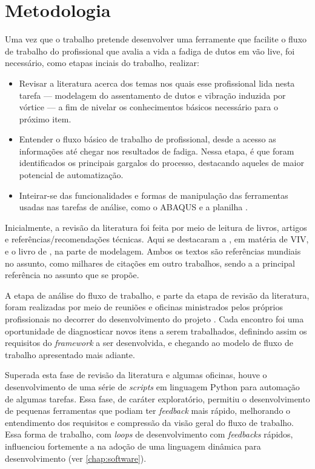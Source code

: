 \chapter{Metodologia}\label{chap:metodologia}


Uma vez que o trabalho pretende desenvolver uma ferramente que facilite o fluxo de trabalho do profissional que avalia a vida a fadiga de dutos em vão live, foi necessário, como etapas inciais do trabalho, realizar:

\begin{itemize}
    \item Revisar a literatura acerca dos temas nos quais esse profissional lida nesta tarefa --- modelagem do assentamento de dutos e vibração induzida por vórtice --- a fim de nivelar os conhecimentos básicos necessário para o próximo item.
    \item Entender o fluxo básico de trabalho de profissional, desde a acesso as informações até chegar nos resultados de fadiga. Nessa etapa, é que foram identificados os principais gargalos do processo, destacando aqueles de maior potencial de automatização.
    \item Inteirar-se das funcionalidades e formas de manipulação das ferramentas usadas nas tarefas de análise, como o ABAQUS e a planilha \fatfree.
\end{itemize}

Inicialmente, a revisão da literatura foi feita por meio de leitura de livros, artigos e referências/recomendações técnicas.
Aqui se destacaram a , em matéria de VIV, e o livro de , na parte de modelagem.
Ambos os textos são referências mundiais no assunto, como milhares de citações em outro trabalhos, sendo a  a principal referência no assunto que se propõe.

A etapa de análise do fluxo de trabalho, e parte da etapa de revisão da literatura, foram realizadas por meio de reuniões e oficinas ministrados pelos próprios profissionais no decorrer do desenvolvimento do projeto \integrispan.
Cada encontro foi uma oportunidade de diagnosticar novos itens a serem trabalhados, definindo assim os requisitos do \textit{framework}  a ser desenvolvida, e chegando ao modelo de fluxo de trabalho apresentado mais adiante.

Superada esta fase de revisão da literatura e algumas oficinas, houve o desenvolvimento de uma série de \textit{scripts} em linguagem Python para automação de algumas tarefas.
Essa fase, de caráter exploratório, permitiu o desenvolvimento de pequenas ferramentas que podiam ter \textit{feedback} mais rápido, melhorando o entendimento dos requisitos e compressão da visão geral do fluxo de trabalho.
Essa forma de trabalho, com \textit{loops} de desenvolvimento com \textit{feedbacks} rápidos, influenciou fortemente a na adoção de uma linguagem dinâmica para desenvolvimento (ver \autoref{chap:software}).

